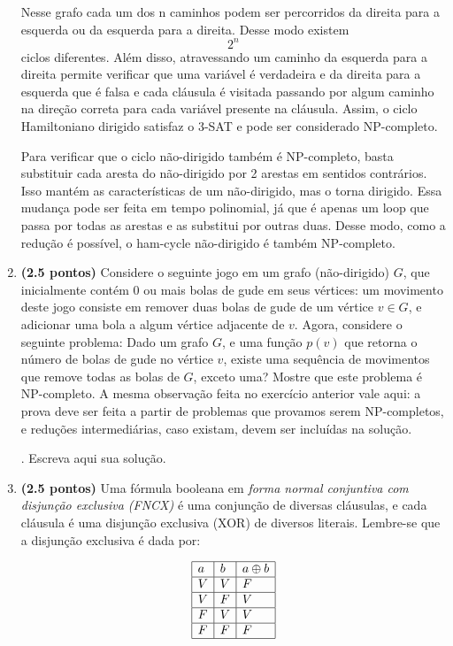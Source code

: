 \documentclass[12pt]{article}
\newcommand{\resposta}[1]{ \noindent {\bf Solução}.{\color{blue} #1}}
\begin{document}
\begin{enumerate}
{Nesse grafo cada um dos n caminhos podem ser percorridos da direita para a esquerda ou da esquerda para a direita. Desse modo existem $$2^n$$ ciclos diferentes. Além disso, atravessando um caminho da esquerda para a direita permite verificar que uma variável é verdadeira e da direita para a esquerda que é falsa e cada cláusula é visitada passando por algum caminho na direção correta para cada variável presente na cláusula. Assim, o ciclo Hamiltoniano dirigido satisfaz o 3-SAT e pode ser considerado NP-completo.

Para verificar que o ciclo não-dirigido também é NP-completo, basta substituir cada aresta do não-dirigido por 2 arestas em sentidos contrários. Isso mantém as características de um não-dirigido, mas o torna dirigido. Essa mudança pode ser feita em tempo polinomial, já que é apenas um loop que passa por todas as arestas e as substitui por outras duas. Desse modo, como a redução é possível, o ham-cycle não-dirigido é também NP-completo.


  }
  
\item {\bf (2.5 pontos)} Considere o seguinte jogo em um grafo
  (não-dirigido) $G$, que inicialmente contém 0 ou mais bolas de gude
  em seus vértices: um movimento deste jogo consiste em remover duas
  bolas de gude de um vértice $v\in G$, e adicionar uma bola a algum
  vértice adjacente de $v$. Agora, considere o seguinte problema: Dado
  um grafo $G$, e uma função $p(v)$ que retorna o número de bolas de
  gude no vértice $v$, existe uma sequência de movimentos que remove
  todas as bolas de $G$, exceto uma? Mostre que este problema é
  NP-completo. A mesma observação feita no exercício anterior vale
  aqui: a prova deve ser feita a partir de problemas que provamos
  serem NP-completos, e reduções intermediárias, caso existam, devem
  ser incluídas na solução.

  \resposta{
    Escreva aqui sua solução.
  }
  
\item {\bf (2.5 pontos)} Uma fórmula booleana em {\it forma normal conjuntiva com disjunção exclusiva (FNCX)} é uma conjunção de diversas cláusulas, e cada cláusula é uma disjunção exclusiva (XOR) de diversos literais. Lembre-se que a disjunção exclusiva é dada por:

  $$\begin{array}{|l|l|l|}\hline
      a & b & a \oplus b \\ \hline
      V & V & F \\ \hline
      V & F & V \\ \hline
      F & V & V \\ \hline
      F & F & F \\ \hline
  \end{array}$$


\end{enumerate}
\end{document}
